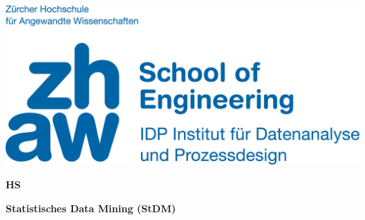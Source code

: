 \noindent
\begin{minipage}[t]{0.4\textwidth} 
\includegraphics[width=\linewidth]{logo.jpg}
\end{minipage}%
\hfill%
\begin{minipage}[t]{0.4\textwidth}\raggedleft
\textbf{\large HS \the\year}
\end{minipage}

\begin{center}
 \textbf{\large Statistisches Data Mining (StDM)} \\
 \vspace{0.3cm}
\end{center}
